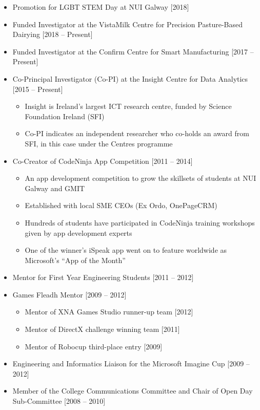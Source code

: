 \documentclass[10pt,a4paper]{res} %
\begin{document}
\begin{resume}
\begin{itemize} \itemsep -2pt
\item Promotion for LGBT STEM Day at NUI Galway [2018]
\item Funded Investigator at the VistaMilk Centre for Precision Pasture-Based Dairying [2018 -- Present]
\item Funded Investigator at the Confirm Centre for Smart Manufacturing [2017 -- Present]
\item Co-Principal Investigator (Co-PI) at the Insight Centre for Data Analytics [2015 -- Present]
\begin{itemize} \itemsep -2pt
\item Insight is Ireland's largest ICT research centre, funded by Science Foundation Ireland (SFI)
\item Co-PI indicates an independent researcher who co-holds an award from SFI, in this case under the Centres programme
\end{itemize}
\item Co-Creator of CodeNinja App Competition [2011 -- 2014]
\begin{itemize} \itemsep -2pt
\item An app development competition to grow the skillsets of students at NUI Galway and GMIT
\item Established with local SME CEOs (Ex Ordo, OnePageCRM)
\item Hundreds of students have participated in CodeNinja training workshops given by app development experts
\item One of the winner's iSpeak app went on to feature worldwide as Microsoft's ``App of the Month''
\end{itemize}
\item Mentor for First Year Engineering Students [2011 -- 2012]
\item Games Fleadh Mentor [2009 -- 2012]
\begin{itemize} \itemsep -2pt
\item Mentor of XNA Games Studio runner-up team [2012]
\item Mentor of DirectX challenge winning team [2011] 
\item Mentor of Robocup third-place entry [2009]
\end{itemize}
\item Engineering and Informatics Liaison for the Microsoft Imagine Cup [2009 -- 2012]
\item Member of the College Communications Committee and Chair of Open Day Sub-Committee [2008 -- 2010]

\end{itemize}
\end{resume}
\end{document}
